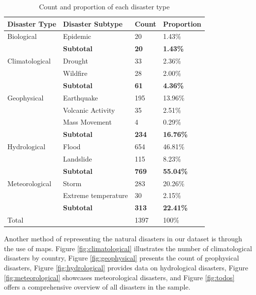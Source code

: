\documentclass{article}
\begin{document}
\begin{table}[H]
    \centering
    \begin{tabular}{llll}
       Disaster Type & Disaster Subtype & Count & Proportion \\
       \toprule
        Biological & Epidemic & 20 & 1.43\%\\
        & \textbf{Subtotal} & \textbf{20} & \textbf{1.43\%} \\ \cmidrule{2-4}
        Climatological & Drought& 33 & 2.36\% \\
        & Wildfire & 28 & 2.00\% \\ 
        & \textbf{Subtotal} & \textbf{61} & \textbf{4.36\%} \\ \cmidrule{2-4}
        Geophysical & Earthquake & 195 & 13.96\% \\
        & Volcanic Activity & 35 & 2.51\% \\
        & Mass Movement & 4 & 0.29\% \\
        & \textbf{Subtotal} & \textbf{234} & \textbf{16.76\%} \\ \cmidrule{2-4}
        Hydrological & Flood& 654 & 46.81\% \\
        & Landslide & 115 & 8.23\% \\ 
        & \textbf{Subtotal} & \textbf{769} & \textbf{55.04\%} \\ \cmidrule{2-4}
        Meteorological & Storm& 283 & 20.26\% \\
        & Extreme temperature & 30 & 2.15\% \\ 
        & \textbf{Subtotal} & \textbf{313} & \textbf{22.41\%} \\ \cmidrule{2-4}
        Total & & 1397 & 100\% \\
        \bottomrule
    \end{tabular}
    \caption{Count and proportion of each disaster type}
    \label{tab:disaster_type}
\end{table}
Another method of representing the natural disasters
in our dataset is through the use of maps. Figure 
\ref{fig:climatological} illustrates the number of 
climatological disasters by country, Figure 
\ref{fig:geophysical} presents the count of 
geophysical disasters, Figure \ref{fig:hydrological} 
provides data on hydrological disasters, Figure 
\ref{fig:meteorological} showcases meteorological 
disasters, and Figure \ref{fig:todos} offers a 
comprehensive overview of all disasters in the 
sample.
\end{document}
